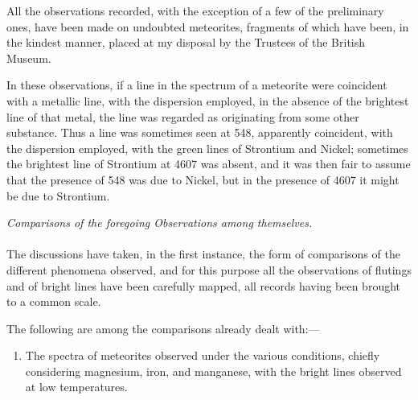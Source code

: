 \documentclass[a4paper, 12pt, oneside, polutonikogreek, english]{article}
\begin{document}
All the observations recorded, with the exception of a few of the preliminary ones, have been made on undoubted meteorites, fragments of which have been, in the kindest manner, placed at my disposal by the Trustees of the British Museum.

In these observations, if a line in the spectrum of a meteorite were coincident with a metallic line, with the dispersion employed, in the absence of the brightest line of that metal, the line was regarded as originating from some other substance. Thus a line was sometimes seen at 548, apparently coincident, with the dispersion employed, with the green lines of Strontium and Nickel; sometimes the brightest line of Strontium at 4607 was absent, and it was then fair to assume that the presence of 548 was due to Nickel, but in the presence of 4607 it might be due to Strontium.
\begin{center}
\emph{Comparisons of the foregoing Observations among themselves.}
\end{center}
\paragraph{}
The discussions have taken, in the first instance, the form of comparisons of the different phenomena observed, and for this purpose all the observations of flutings and of bright lines have been carefully mapped, all records having been brought to a common scale.

The following are among the comparisons already dealt with:---
\begin{enumerate}
    \item The spectra of meteorites observed under the various conditions, chiefly considering magnesium, iron, and manganese, with the bright lines observed at low temperatures.
\end{enumerate}
\end{document}
